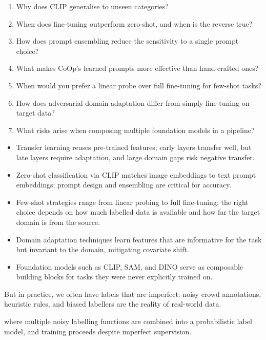 
\begin{enumerate}
    \item Why does CLIP generalise to unseen categories?
    \item When does fine-tuning outperform zero-shot, and when is the reverse true?
    \item How does prompt ensembling reduce the sensitivity to a single prompt choice?
    \item What makes CoOp's learned prompts more effective than hand-crafted ones?
    \item When would you prefer a linear probe over full fine-tuning for few-shot tasks?
    \item How does adversarial domain adaptation differ from simply fine-tuning on target data?
    \item What risks arise when composing multiple foundation models in a pipeline?
\end{enumerate}

\vspace{1.5em}


\begin{itemize}
    \item Transfer learning reuses pre-trained features; early layers transfer well, but late layers require adaptation, and large domain gaps risk negative transfer.
    \item Zero-shot classification via CLIP matches image embeddings to text prompt embeddings; prompt design and ensembling are critical for accuracy.
    \item Few-shot strategies range from linear probing to full fine-tuning; the right choice depends on how much labelled data is available and how far the target domain is from the source.
    \item Domain adaptation techniques learn features that are informative for the task but invariant to the domain, mitigating covariate shift.
    \item Foundation models such as CLIP, SAM, and DINO serve as composable building blocks for tasks they were never explicitly trained on.
\end{itemize}

\vspace{2.5em}


 But in practice, we often have labels that are imperfect: noisy crowd annotations, heuristic rules, and biased labellers are the reality of real-world data.

 where multiple noisy labelling functions are combined into a probabilistic label model, and training proceeds despite imperfect supervision.

